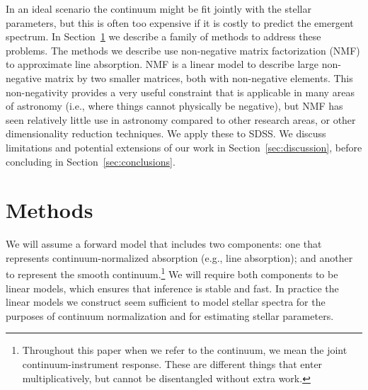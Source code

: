\documentclass[modern]{aastex631}
\newcommand{\project}[1]{\textit{#1}}
\newcommand{\sdss}{\project{SDSS}}
\newcommand{\todo}[1]{\textcolor{tab:red}{#1}}
\begin{document}
In an ideal scenario the continuum might be fit jointly with the stellar parameters, but this is often too expensive if it is costly to predict the emergent spectrum. In Section~\ref{sec:methods} we describe a family of methods to address these problems. 
The methods we describe use non-negative matrix factorization (NMF) to approximate line absorption. NMF is a linear model to describe large non-negative matrix by two smaller matrices, both with non-negative elements. This non-negativity provides a very useful constraint that is applicable in many areas of astronomy (i.e., where things cannot physically be negative), but NMF has seen relatively little use in astronomy compared to other research areas, or other dimensionality reduction techniques. 
\todo{We apply these to SDSS.}
We discuss limitations and potential extensions of our work in Section~\ref{sec:discussion}, before concluding in Section~\ref{sec:conclusions}.\\

\section{Methods}\label{sec:methods}

We will assume a forward model that includes two components: one that represents continuum-normalized absorption (e.g., line absorption); and another to represent the smooth continuum.\footnote{Throughout this paper when we refer to the continuum, we mean the joint continuum-instrument response. These are different things that enter multiplicatively, but cannot be disentangled without extra work.} We will require both components to be linear models, which ensures that inference is stable and fast. In practice the linear models we construct seem sufficient to model stellar spectra for the purposes of continuum normalization and for estimating stellar parameters.\\



\end{document}
